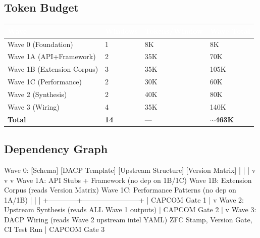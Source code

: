 \documentclass[11pt,letterpaper]{article}
\newcommand{\tableheader}[1]{\textbf{\sffamily\textcolor{white}{#1}}}
\begin{document}
\subsection{Token Budget}

\begin{center}
\begin{tabularx}{\textwidth}{L{4cm}C{2.5cm}C{2.5cm}C{2.5cm}}
\toprule
{}
\tableheader{Wave} & \tableheader{Windows} & \tableheader{Tokens/Window} & \tableheader{Wave Total} \\
\midrule
Wave 0 (Foundation) & 1 & 8K & 8K \\
Wave 1A (API+Framework) & 2 & 35K & 70K \\
Wave 1B (Extension Corpus) & 3 & 35K & 105K \\
Wave 1C (Performance) & 2 & 30K & 60K \\
Wave 2 (Synthesis) & 2 & 40K & 80K \\
Wave 3 (Wiring) & 4 & 35K & 140K \\
\hline
{}
\textbf{Total} & \textbf{14} & --- & \textbf{$\sim$463K} \\
\bottomrule
\end{tabularx}
\end{center}

\subsection{Dependency Graph}

\begin{asciibox}
Wave 0: [Schema] [DACP Template] [Upstream Structure] [Version Matrix]
   |            |                        |
   v            v                        v
Wave 1A:  API Stubs + Framework     (no dep on 1B/1C)
Wave 1B:  Extension Corpus          (reads Version Matrix)
Wave 1C:  Performance Patterns      (no dep on 1A/1B)
   |            |                        |
   +------------+------------------------+
                         |
                    CAPCOM Gate 1
                         |
                         v
Wave 2:   Upstream Synthesis (reads ALL Wave 1 outputs)
                         |
                    CAPCOM Gate 2
                         |
                         v
Wave 3:   DACP Wiring (reads Wave 2 upstream intel YAML)
          ZFC Stamp, Version Gate, CI Test Run
                         |
                    CAPCOM Gate 3
\end{asciibox}
\end{document}
